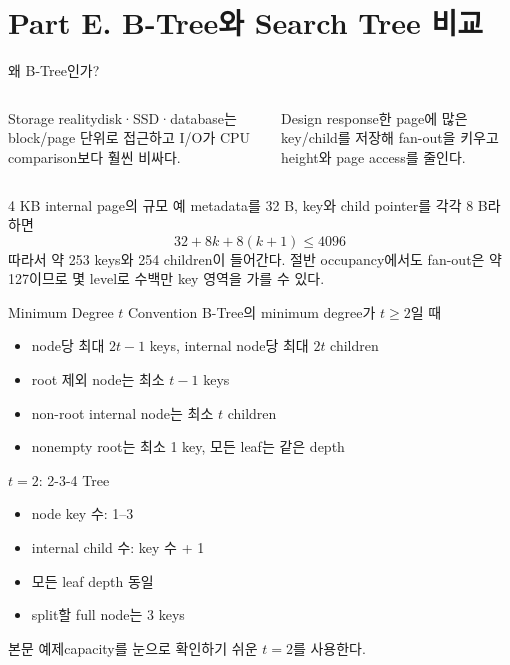 \section{Part E. B-Tree와 Search Tree 비교}
\begin{frame}{왜 B-Tree인가?}
\small
\begin{columns}[T]
\begin{block}{Storage reality}disk·SSD·database는 block/page 단위로 접근하고 I/O가 CPU comparison보다 훨씬 비싸다.\end{block}
\begin{block}{Design response}한 page에 많은 key/child를 저장해 fan-out을 키우고 height와 page access를 줄인다.\end{block}
\end{columns}
\begin{block}{4 KB internal page의 규모 예}
metadata를 32 B, key와 child pointer를 각각 8 B라 하면
\[
32+8k+8(k+1)\le4096
\]
따라서 약 253 keys와 254 children이 들어간다. 절반 occupancy에서도 fan-out은 약 127이므로 몇 level로 수백만 key 영역을 가를 수 있다.
\end{block}
\end{frame}
\begin{frame}{Minimum Degree \texorpdfstring{$t$}{t} Convention}
B-Tree의 minimum degree가 $t\ge2$일 때
\begin{itemize}
\item node당 최대 $2t-1$ keys, internal node당 최대 $2t$ children
\item root 제외 node는 최소 $t-1$ keys
\item non-root internal node는 최소 $t$ children
\item nonempty root는 최소 1 key, 모든 leaf는 같은 depth
\end{itemize}
\end{frame}
\begin{frame}{\texorpdfstring{$t=2$}{t=2}: 2-3-4 Tree}
\begin{itemize}\item node key 수: 1–3\item internal child 수: key 수 + 1\item 모든 leaf depth 동일\item split할 full node는 3 keys\end{itemize}
\begin{block}{본문 예제}capacity를 눈으로 확인하기 쉬운 $t=2$를 사용한다.\end{block}
\end{frame}
